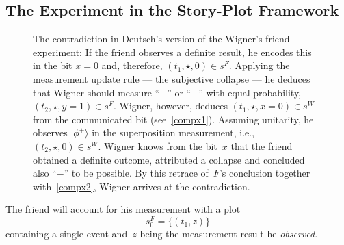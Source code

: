 \documentclass[aps,pra,12pt]{revtex4-2}
\newcommand{\ket}[1]{|#1 \rangle}
\theoremstyle{definition}
\theoremstyle{remark}
\begin{document}
\subsection{The Experiment in the Story-Plot Framework}
\begin{figure}
\centering
{}
\caption{The contradiction in Deutsch's version of the Wigner's-friend experiment: If the friend observes a definite result, he encodes this in the bit $x=0$ and, therefore, $(t_1,\star,0) \in s^F$. 
Applying the measurement update rule --- the subjective collapse --- he deduces that Wigner should measure ``$+$'' or ``$-$'' with equal probability, $(t_2, \star, y=1) \in s^F$. 
Wigner, however, deduces  $(t_1,\star,x=0) \in s^W$ from the communicated bit (see~\eqref{compx1}). 
Assuming unitarity, he observes $\ket{\phi^+}$ in the superposition measurement, i.e., $(t_2, \star, 0) \in s^W$. 
Wigner knows from the bit~$x$ that the friend obtained a definite outcome, attributed a collapse and concluded also ``$-$'' to be possible.
By this retrace of~$F$'s conclusion together with~\eqref{compx2}, Wigner arrives at the contradiction.}
\label{fig:WF-paradox}
\end{figure}
\noindent
The friend will account for his measurement with a plot
\begin{equation} \label{sfriend0}
s_0^F = \{ (t_1, z) \}
\end{equation}
containing a single event and~$z$ being the measurement result he \emph{observed}.
\end{document}
